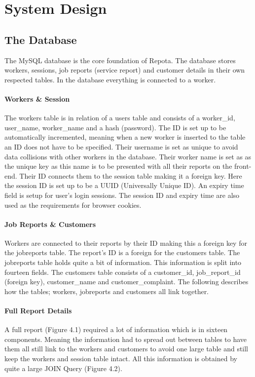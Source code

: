 \chapter{System Design}
\section{The Database}
The MySQL database is the core foundation of Repota. The database stores workers, sessions, job reports (service report) and customer details in their own respected tables. In the database everything is connected to a worker. 

\subsubsection{Workers \& Session}
The workers table is in relation of a users table and consists of a worker\_id, user\_name, worker\_name and a hash (password). The ID is set up to be automatically incremented, meaning when a new worker is inserted to the table an ID does not have to be specified. Their username is set as unique to avoid data collisions with other workers in the database. Their worker name is set as as the unique key as this name is to be presented with all their reports on the front-end. Their ID connects them to the session table making it a foreign key. Here the session ID is set up to be a UUID (Universally Unique ID). An expiry time field is setup for user's login sessions. The session ID and expiry time are also used as the requirements for browser cookies.

\subsubsection{Job Reports \& Customers}
Workers are connected to their reports by their ID making this a foreign key for the jobreports table. The report's ID is a foreign for the customers table. The jobreports table holds quite a bit of information. This information is split into fourteen fields. The customers table consists of a customer\_id, job\_report\_id (foreign key), customer\_name and customer\_complaint.  The following describes how the tables; workers, jobreports and customers all link together. 
\newpage
\subsubsection{Full Report Details}
A full report (Figure 4.1) required a lot of information which is in sixteen components. Meaning the information had to spread out between tables to have them all still link to the workers and customers to avoid one large table and still keep the workers and session table intact. All this information is obtained by quite a large JOIN Query (Figure 4.2).


